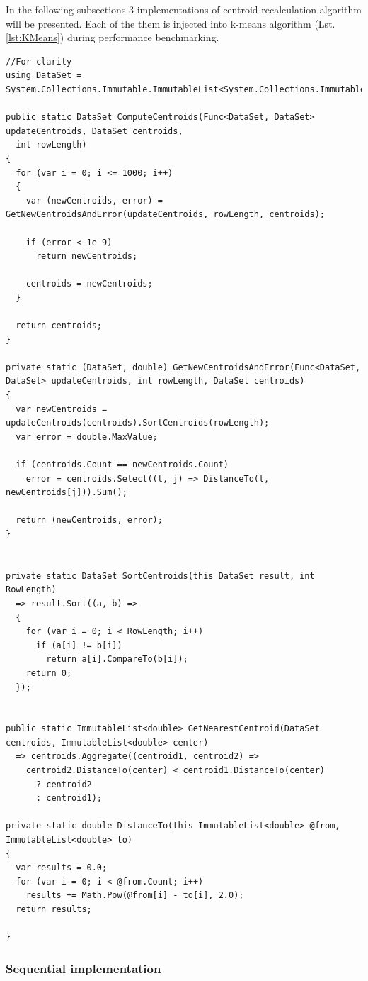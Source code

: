 In the following subsections 3 implementations of centroid recalculation algorithm will be presented. Each of the them is injected into k-means algorithm (Lst. \ref{lst:KMeans}) during performance benchmarking.

\begin{lstlisting}[style=sharpcstyle, caption={K-means centroid computation}, label={lst:KMeans}]
//For clarity
using DataSet = System.Collections.Immutable.ImmutableList<System.Collections.Immutable.ImmutableList<double>>;

public static DataSet ComputeCentroids(Func<DataSet, DataSet> updateCentroids, DataSet centroids,
  int rowLength)
{
  for (var i = 0; i <= 1000; i++)
  {
    var (newCentroids, error) = GetNewCentroidsAndError(updateCentroids, rowLength, centroids);

    if (error < 1e-9)
      return newCentroids;
    
    centroids = newCentroids;
  }

  return centroids;
}

private static (DataSet, double) GetNewCentroidsAndError(Func<DataSet, DataSet> updateCentroids, int rowLength, DataSet centroids)
{
  var newCentroids = updateCentroids(centroids).SortCentroids(rowLength);
  var error = double.MaxValue;

  if (centroids.Count == newCentroids.Count)
    error = centroids.Select((t, j) => DistanceTo(t, newCentroids[j])).Sum();

  return (newCentroids, error);
}


private static DataSet SortCentroids(this DataSet result, int RowLength)
  => result.Sort((a, b) =>
  {
    for (var i = 0; i < RowLength; i++)
      if (a[i] != b[i])
        return a[i].CompareTo(b[i]);
    return 0;
  });


public static ImmutableList<double> GetNearestCentroid(DataSet centroids, ImmutableList<double> center) 
  => centroids.Aggregate((centroid1, centroid2) => 
    centroid2.DistanceTo(center) < centroid1.DistanceTo(center)
      ? centroid2
      : centroid1);

private static double DistanceTo(this ImmutableList<double> @from, ImmutableList<double> to)
{
  var results = 0.0;
  for (var i = 0; i < @from.Count; i++)
    results += Math.Pow(@from[i] - to[i], 2.0);
  return results;

}
\end{lstlisting}

\subsubsection{Sequential implementation}

